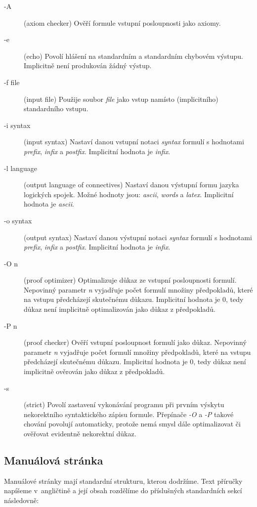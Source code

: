 \documentclass[thesis=B,czech,hidelinks]{thesis}[2012/06/26]
\begin{document}
\begin{description}
	\item[-A] (axiom checker) Ověří formule vstupní posloupnosti jako axiomy.
	\item[-e] (echo) Povolí hlášení na standardním a standardním chybovém výstupu. Implicitně není produkován žádný výstup.
	\item[-f file] (input file) Použije soubor \emph{file} jako vstup namísto (implicitního) standardního vstupu.
	\item[-i syntax] (input syntax) Nastaví danou vstupní notaci \emph{syntax} formulí s hodnotami \emph{prefix}, \emph{infix} a \emph{postfix}. Implicitní hodnota je \emph{infix}.
	\item[-l language] (output language of connectives) Nastaví danou výstupní formu jazyka logických spojek. Možné hodnoty jsou: \emph{ascii}, \emph{words} a \emph{latex}. Implicitní hodnota je \emph{ascii}.
	\item[-o syntax] (output syntax) Nastaví danou výstupní notaci \emph{syntax} formulí s hodnotami \emph{prefix}, \emph{infix} a \emph{postfix}. Implicitní hodnota je \emph{infix}.
	\item[-O n] (proof optimizer) Optimalizuje důkaz ze vstupní posloupnosti formulí. Nepovinný parametr \emph{n} vyjadřuje počet formulí množiny předpokladů, které na vstupu předcházejí skutečnému důkazu. Implicitní hodnota je 0, tedy důkaz není implicitně optimalizován jako důkaz z předpokladů.
	\item[-P n] (proof checker) Ověří vstupní posloupnost formulí jako důkaz. Nepovinný parametr \emph{n} vyjadřuje počet formulí množiny předpokladů, které na vstupu předcházejí skutečnému důkazu. Implicitní hodnota je 0, tedy důkaz není implicitně ověrován jako důkaz z předpokladů.
	\item[-s] (strict) Povolí zastavení vykonávání programu při prvním výskytu nekorektního syntaktického zápisu formule. Přepínače \emph{-O} a \emph{-P} takové chování povolují automaticky, protože nemá smysl dále optimalizovat či ověřovat evidentně nekorektní důkaz.
\end{description}

\subsection{Manuálová stránka}

Manuálové stránky mají standardní strukturu, kterou dodržíme. Text příručky napíšeme v~angličtině a její obsah rozdělíme do příslušných standardních sekcí následovně:
\end{document}
